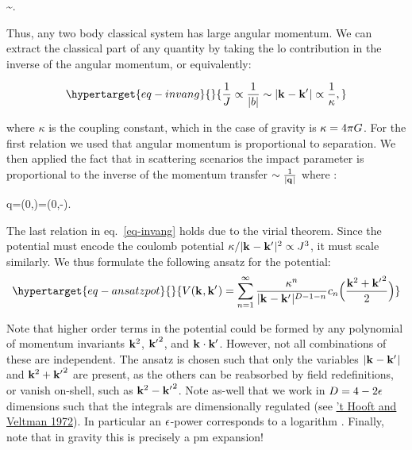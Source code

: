 \documentclass[
  11pt,
  a4paper,
  DIV=11,
  numbers=noendperiod,
  oneside]{scrreprt}
\let\[\relax \let\]\relax %
\DeclareRobustCommand{\[}{\begin{equation}}
\DeclareRobustCommand{\]}{\end{equation}}
\begin{document}
\[
\sim{}.
\]

Thus, any two body classical system has large angular momentum. We can
extract the classical part of any quantity by taking the \gls{lo}
contribution in the inverse of the angular momentum, or equivalently:

\begin{equation}\protect\hypertarget{eq-invang}{}{
  \inv{J} \propto \inv{\abs{\impactParameter}} \sim \abs{\tv{k}-\tv{k'}}\propto \inv{\kappa},
}\label{eq-invang}\end{equation}

where \(\kappa\) is the coupling constant, which in the case of gravity
is \(\kappa=4\pi G\). For the first relation we used that angular
momentum is proportional to separation. We then applied the fact that in
scattering scenarios the impact parameter is proportional to the inverse
of the momentum transfer \(\sim\frac{1}{\vert\mathbf{{q}}_{} \vert}\) where :

\[
q=(0,)=(0,-).
\]

The last relation in eq.~\ref{eq-invang} holds due to the virial
theorem. Since the potential must encode the coulomb potential
\(\kappa/\vert\mathbf{{k}}_{}-\mathbf{{k'}}_{} \vert^2\propto J^3\), it must scale similarly.
We thus formulate the following ansatz for the potential:
\begin{equation}\protect\hypertarget{eq-ansatzpot}{}{
\pot(\tv{k},\tv{k'})=\sum_{n=1}^\infty \frac{\kappa^n}{\abs{\tv{k}-\tv{k'}}^{\Dim-1-n}} c_n\pa[\Big]{\frac{\tv{k}^2+\tv{k'}^2}{2}}
}\label{eq-ansatzpot}\end{equation}

Note that higher order terms in the potential could be formed by any
polynomial of momentum invariants \(\mathbf{{k}}_{}^2\), \(\mathbf{{k'}}_{}^2\), and
\(\mathbf{{k}}_{}\cdot\mathbf{{k'}}_{}\). However, not all combinations of these are
independent. The ansatz is chosen such that only the variables
\(\vert\mathbf{{k}}_{}-\mathbf{{k'}}_{} \vert\) and \(\mathbf{{k}}_{}^2+\mathbf{{k'}}_{}^2\) are present, as the
others can be reabsorbed by field redefinitions, or vanish on-shell,
such as \(\mathbf{{k}}_{}^2-\mathbf{{k'}}_{}^2\). Note as-well that we work in
\(D=4-2\epsilon\) dimensions such that the integrals are dimensionally
regulated (see \protect\hyperlink{ref-tHooft:1972tcz}{'t Hooft and
Veltman 1972}). In particular an \(\epsilon\)-power corresponds to a
logarithm .
Finally, note that in gravity this is precisely a \gls{pm} expansion!
\end{document}
